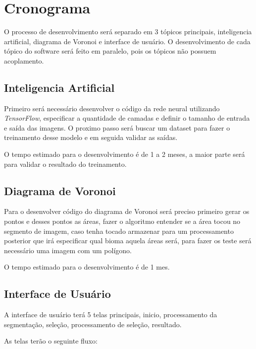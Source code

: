\section{Cronograma}

O processo de desenvolvimento será separado em 3 tópicos principais, inteligencia artificial, diagrama de Voronoi e interface de usuário. O desenvolvimento de cada tópico do software será feito em paralelo, pois os tópicos não possuem acoplamento.

\subsection*{Inteligencia Artificial}

Primeiro será necessário desenvolver o código da rede neural utilizando \textit{TensorFlow}, especificar a quantidade de camadas e definir o tamanho de entrada e saída das imagens.
O proximo passo será buscar um dataset para fazer o treinamento desse modelo e em seguida validar as saídas.

O tempo estimado para o desenvolvimento é de 1 a 2 meses, a maior parte será para validar o resultado do treinamento.

\subsection*{Diagrama de Voronoi}

Para o desenvolver código do diagrama de Voronoi será preciso primeiro gerar os pontos e desses pontos as áreas, fazer o algoritmo entender se a área tocou no segmento de imagem, caso tenha tocado armazenar para um processamento posterior que irá especificar qual bioma aquela áreas será, para fazer os teste será necessário uma imagem com um polígono.

O tempo estimado para o desenvolvimento é de 1 mes.

\subsection*{Interface de Usuário}

A interface de usuário terá 5 telas principais, inicio, processamento da segmentação, seleção, processamento de seleção, resultado. 

As telas terão o seguinte fluxo:

